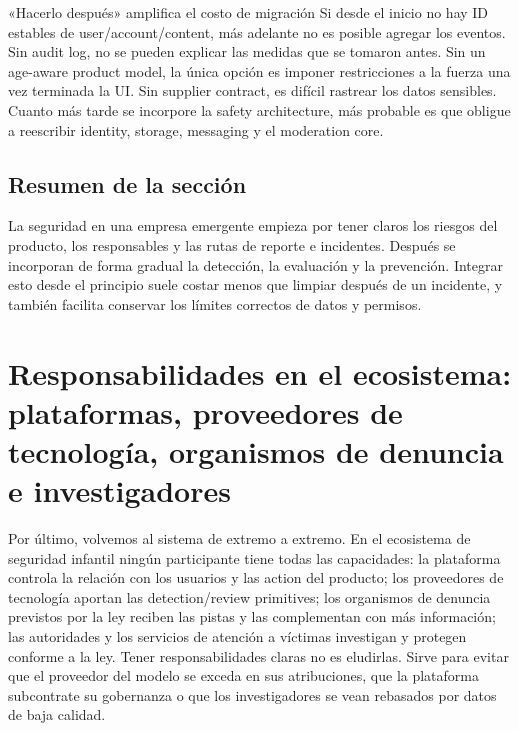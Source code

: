 \documentclass[a4paper]{article}
\begin{document}
\begin{warningbox}{«Hacerlo después» amplifica el costo de migración}
Si desde el inicio no hay ID estables de user/account/content, más adelante no es posible agregar los eventos. Sin audit log, no se pueden explicar las medidas que se tomaron antes. Sin un age-aware product model, la única opción es imponer restricciones a la fuerza una vez terminada la UI. Sin supplier contract, es difícil rastrear los datos sensibles. Cuanto más tarde se incorpore la safety architecture, más probable es que obligue a reescribir identity, storage, messaging y el moderation core.
\end{warningbox}


\subsection{Resumen de la sección}

La seguridad en una empresa emergente empieza por tener claros los riesgos del producto, los responsables y las rutas de reporte e incidentes. Después se incorporan de forma gradual la detección, la evaluación y la prevención. Integrar esto desde el principio suele costar menos que limpiar después de un incidente, y también facilita conservar los límites correctos de datos y permisos.
\section{Responsabilidades en el ecosistema: plataformas, proveedores de tecnología, organismos de denuncia e investigadores}

Por último, volvemos al sistema de extremo a extremo. En el ecosistema de seguridad infantil ningún participante tiene todas las capacidades: la plataforma controla la relación con los usuarios y las action del producto; los proveedores de tecnología aportan las detection/review primitives; los organismos de denuncia previstos por la ley reciben las pistas y las complementan con más información; las autoridades y los servicios de atención a víctimas investigan y protegen conforme a la ley. Tener responsabilidades claras no es eludirlas. Sirve para evitar que el proveedor del modelo se exceda en sus atribuciones, que la plataforma subcontrate su gobernanza o que los investigadores se vean rebasados por datos de baja calidad.
\end{document}
